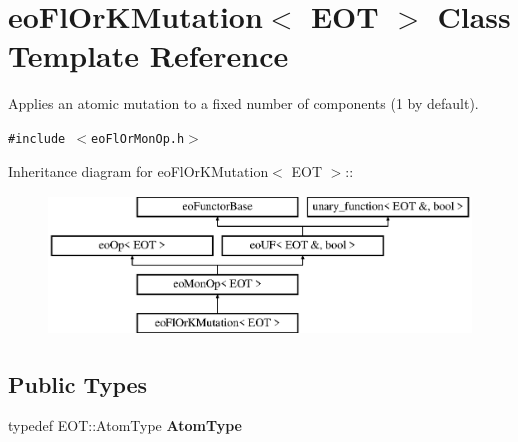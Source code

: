 \section{eo\-Fl\-Or\-KMutation$<$ EOT $>$ Class Template Reference}
\label{classeo_fl_or_k_mutation}
Applies an atomic mutation to a fixed number of components (1 by default).  


{\tt \#include $<$eo\-Fl\-Or\-Mon\-Op.h$>$}

Inheritance diagram for eo\-Fl\-Or\-KMutation$<$ EOT $>$::\begin{figure}[H]
\begin{center}
\leavevmode
\includegraphics[height=3.71476cm]{classeo_fl_or_k_mutation}
\end{center}
\end{figure}
\subsection*{Public Types}
\begin{CompactItemize}
\item 
typedef EOT::Atom\-Type {\bf Atom\-Type}\label{classeo_fl_or_k_mutation_w0}

\end{CompactItemize}
